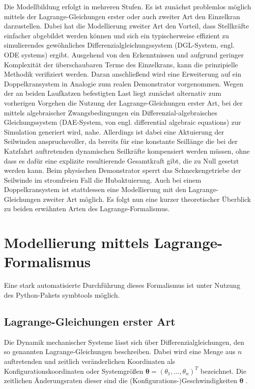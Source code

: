 Die Modellbildung erfolgt in mehreren Stufen. Es ist zunächst problemlos möglich mittels der Lagrange-Gleichungen erster oder auch zweiter Art den Einzelkran darzustellen. Dabei hat die Modellierung zweiter Art den Vorteil, dass Stellkräfte einfacher abgebildet werden können und sich ein typischerweise effizient zu simulierendes gewöhnliches Differenzialgleichungssystem (DGL-System, engl. ODE systems) ergibt. Ausgehend von den Erkenntnissen und aufgrund geringer Komplexität der überschaubaren Terme des Einzelkrans, kann die prinzipielle Methodik verifiziert werden. Daran anschließend wird eine Erweiterung auf ein Doppelkransystem in Analogie zum realen Demonstrator vorgenommen. Wegen der an beiden Laufkatzen befestigten Last liegt zunächst alternativ zum vorherigen Vorgehen die Nutzung der Lagrange-Gleichungen erster Art, bei der mittels algebraischer Zwangsbedingungen ein Differenzial-algebraisches Gleichungssystem (DAE-System, von engl. differential algebraic equations) zur Simulation generiert wird, nahe. Allerdings ist dabei eine Aktuierung der Seilwinden anspruchsvoller, da bereits für eine konstante Seillänge die bei der Katzfahrt auftretenden dynamischen Seilkräfte kompensiert werden müssen, ohne dass es dafür eine explizite resultierende Gesamtkraft gibt, die zu Null gesetzt werden kann. Beim physischen Demonstrator sperrt das Schneckengetriebe der Seilwinde im stromfreien Fall die Hubaktuierung. Auch bei einem Doppelkransystem ist stattdessen eine Modellierung mit den Lagrange-Gleichungen zweiter Art möglich. Es folgt nun eine kurzer theoretischer Überblick zu beiden erwähnten Arten des Lagrange-Formalismus.

\section{Modellierung mittels Lagrange-Formalismus}

Eine stark automatisierte Durchführung dieses Formalismus ist unter Nutzung des Python-Pakets symbtools \cite{symbtools} möglich.

\subsection{Lagrange-Gleichungen erster Art}
\label{sec:Lagrange1_theory}
Die Dynamik mechanischer Systeme lässt sich über Differenzialgleichungen, den so genannten Lagrange-Gleichungen beschreiben. Dabei wird eine Menge aus $n$ auftretenden und zeitlich veränderlichen Koordinaten als Konfigurationskoordinaten oder Systemgrößen $\mathbf{\theta} = (\theta_1, ..., \theta_n)^T$ bezeichnet. Die zeitlichen Änderungsraten dieser sind die (Konfigurations-)Geschwindigkeiten $\dot{\mathbf{\theta}}$ \cite[S.7]{DissKnoll}. 

